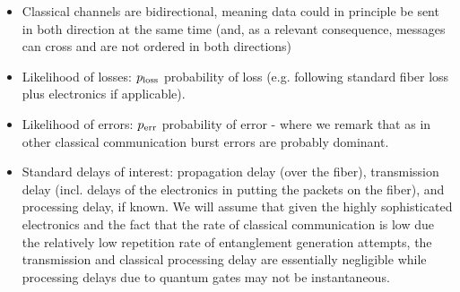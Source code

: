 \documentclass{article}
\begin{document}
\begin{itemize}
\item Classical channels are bidirectional, meaning data could in principle be sent in both direction at the same time (and, as a relevant consequence, messages can cross and are not ordered in both directions)
\item Likelihood of losses: $p_{\rm loss}$ probability of loss (e.g. following standard fiber loss plus electronics if applicable).
\item Likelihood of errors:  $p_{\rm err}$ probability of error - where we remark that as in other classical communication burst errors are probably dominant.
\item Standard delays of interest: propagation delay (over the fiber), transmission delay (incl. delays of the electronics in putting the packets on the fiber), and processing delay, if known. We will assume that given the highly sophisticated electronics and the fact that the rate of classical communication is low due the relatively low repetition rate of entanglement generation attempts, the transmission and classical processing delay are essentially negligible while processing delays due to quantum gates may not be instantaneous.
\end{itemize}
\end{document}

